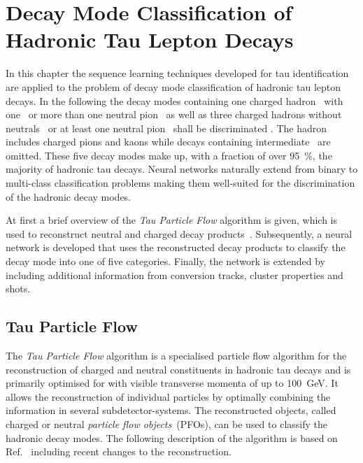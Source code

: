 \chapter{Decay Mode Classification of Hadronic Tau Lepton Decays}
\label{sec:decaymode}

In this chapter the sequence learning techniques developed for tau
identification are applied to the problem of decay mode classification of
hadronic tau lepton decays.
In the following the decay modes containing one charged hadron~
with one~ or more than one neutral
pion~ as well as three charged hadrons without
neutrals~ or at least one neutral
pion~ shall be discriminated . The hadron~ includes
charged pions and kaons while decays containing intermediate~ are
omitted. These five decay modes make up, with a fraction of over
\SI{95}{\percent}, the majority of hadronic tau decays.
Neural networks naturally extend from binary to multi-class classification
problems making them well-suited for the discrimination of the hadronic decay
modes.

At first a brief overview of the \emph{Tau Particle Flow} algorithm is given,
which is used to reconstruct neutral and charged decay
products~\cite{atlas:taurec:decaymodes}. Subsequently, a neural network is
developed that uses the reconstructed decay products to classify the decay mode
into one of five categories. Finally, the network is extended by including
additional information from conversion tracks, cluster properties and shots.

\section{Tau Particle Flow}
\label{sec:tau_pflow}


The \emph{Tau Particle Flow} algorithm is a specialised particle flow algorithm
for the reconstruction of charged and neutral constituents in hadronic tau
decays and is primarily optimised for \tauhadvis with visible transverse momenta
of up to \SI{100}{\giga\electronvolt}. It allows the reconstruction of
individual particles by optimally combining the information in several
subdetector-systems. The reconstructed objects, called charged or neutral
\emph{particle flow objects}~(PFOs), can be used to classify the hadronic decay
modes. The following description of the algorithm is based on
Ref.~\cite{atlas:taurec:decaymodes} including recent changes to the
reconstruction.

